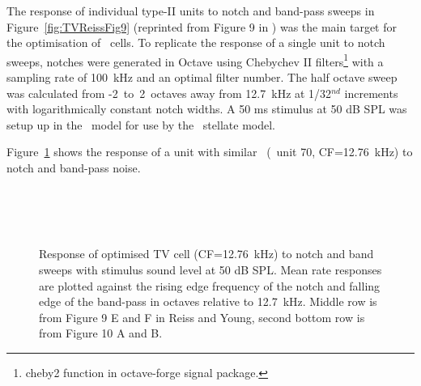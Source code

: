 The response of individual type-II units to notch and band-pass sweeps in
Figure~\ref{fig:TVReissFig9} (reprinted from Figure 9 in
\citep*{ReissYoung:2005}) was the main target for the optimisation of \TV~cells.
To replicate the response of a single unit to notch sweeps, notches were
generated in Octave using Chebychev II filters\footnote{\textsf{cheby2} function
  in octave-forge signal package.}  with a sampling rate of 100~kHz and an
optimal filter number.  The half octave sweep was calculated from
-2~to~2~octaves away from 12.7~kHz at 1/32$^{nd}$ increments with
logarithmically constant notch widths\footnotemark. A 50 ms stimulus at 50 dB
SPL was setup up in the \AN~model for use by the \CN~stellate model.



\smallskip{}


Figure~\ref{fig:TV_SweepUnit70} shows the response of a unit with similar
\CF~(\TV~unit 70, CF=12.76~kHz) to notch and band-pass noise.

\begin{figure}[h!]
  \centering
  \\
  \\
  \\
  \caption{Response of optimised TV cell (CF=12.76~kHz) to notch and band sweeps
    with stimulus sound level at 50 dB SPL\@. Mean rate responses are plotted
    against the rising edge frequency of the notch and falling edge of the
    band-pass in octaves relative to 12.7~kHz. Middle row is from Figure 9 E and
    F in Reiss and Young, second bottom row is from Figure 10 A and B. }
  \label{fig:TV_SweepUnit70}
\end{figure}





